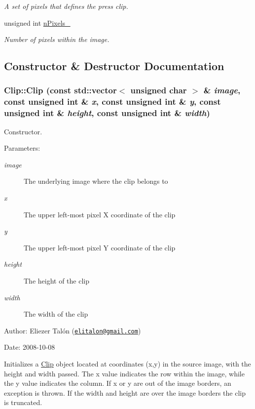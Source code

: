 \begin{CompactItemize}
\begin{CompactList}\small\item\em A set of pixels that defines the press clip. \item\end{CompactList}\item 
\hypertarget{class_clip_7e2bd80cd0cc06f6d4c3ebe6a22c573d}{
unsigned int \hyperlink{class_clip_7e2bd80cd0cc06f6d4c3ebe6a22c573d}{nPixels\_\-}}
\label{class_clip_7e2bd80cd0cc06f6d4c3ebe6a22c573d}

\begin{CompactList}\small\item\em Number of pixels within the image. \item\end{CompactList}\end{CompactItemize}


\subsection{Constructor \& Destructor Documentation}
\hypertarget{class_clip_7e151616bf9c24c77aa5d1a0d341aa2a}{
\subsubsection[Clip]{\setlength{\rightskip}{0pt plus 5cm}Clip::Clip (const std::vector$<$ unsigned char $>$ \& {\em image}, \/  const unsigned int \& {\em x}, \/  const unsigned int \& {\em y}, \/  const unsigned int \& {\em height}, \/  const unsigned int \& {\em width})}}
\label{class_clip_7e151616bf9c24c77aa5d1a0d341aa2a}


Constructor. 

\begin{Desc}
\item[Parameters:]
\begin{description}
\item[{\em image}]The underlying image where the clip belongs to \item[{\em x}]The upper left-most pixel X coordinate of the clip \item[{\em y}]The upper left-most pixel Y coordinate of the clip \item[{\em height}]The height of the clip \item[{\em width}]The width of the clip\end{description}
\end{Desc}
\begin{Desc}
\item[Author:]Eliezer Talón (\href{mailto:elitalon@gmail.com}{\tt elitalon@gmail.com}) \end{Desc}
\begin{Desc}
\item[Date:]2008-10-08\end{Desc}
Initializes a \hyperlink{class_clip}{Clip} object located at coordinates (x,y) in the source image, with the height and width passed. The x value indicates the row within the image, while the y value indicates the column. If x or y are out of the image borders, an exception is thrown. If the width and height are over the image borders the clip is truncated. 

